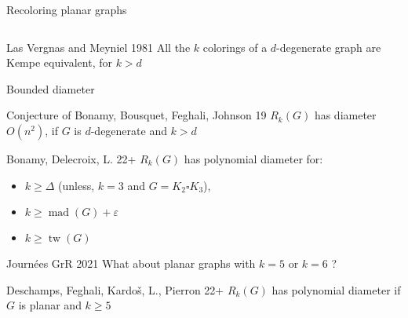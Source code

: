 \documentclass[11pt,xcolor=dvipsnames,presentation]{beamer}
\DeclareMathOperator{\mad}{mad}
\DeclareMathOperator{\tw}{tw}
\begin{document}
\begin{frame}{Recoloring planar graphs}
\begin{columns}
\begin{column}{.45\textwidth}
    \end{column}
  \end{columns}

  \begin{block}{Las Vergnas and Meyniel 1981}
    All the $k$ colorings of a $d$-degenerate graph are Kempe equivalent, for $k>d$
  \end{block}
\end{frame}

\begin{frame}{Bounded diameter}
  \begin{alertblock}{Conjecture of Bonamy, Bousquet, Feghali, Johnson 19}  
    $R_k(G)$ has diameter $O(n^2)$, if $G$ is $d$-degenerate and $k > d$
  \end{alertblock}
  
  \begin{block}{Bonamy, Delecroix, L. 22+}
    $R_k(G)$ has polynomial diameter for: 
    \begin{itemize}
    \item $k \ge \Delta$ (unless, $k=3$ and $G = K_2 \square K_3$),
    \item $k \ge \mad(G) + \varepsilon$
    \item $k \ge \tw(G)$
    \end{itemize}
  \end{block}

  \begin{alertblock}{Journées GrR 2021}
    What about planar graphs with $k = 5$ or $k = 6$ ?
  \end{alertblock}

  \begin{block}{Deschamps, Feghali, Kardoš, L., Pierron 22+}
    $R_k(G)$ has polynomial diameter if $G$ is planar and $k \ge 5$
  \end{block}
\end{frame}
\end{document}
